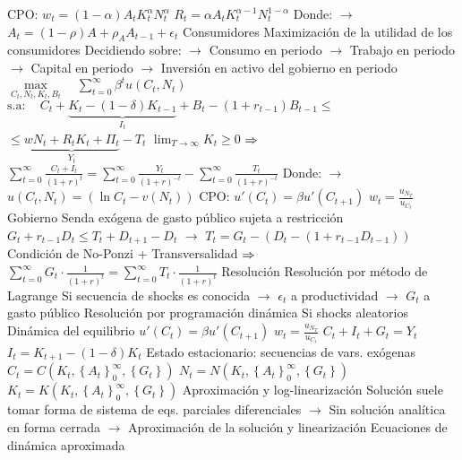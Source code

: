\documentclass{nuevotema}
\begin{document}
\begin{esquemal}
				\4[] CPO: \quad $w_t = (1-\alpha) A_t K_t^\alpha N_t^\alpha$
				\4[] \quad \quad $R_t = \alpha A_t K_t^{\alpha-1} N_t^{1-\alpha}$
				\4[] Donde:
				\4[] $\to$ $A_t = (1-\rho)A + \rho_A A_{t-1} + \epsilon_t$
			\3 Consumidores
				\4 Maximización de la utilidad de los consumidores
				\4[] Decidiendo sobre:
				\4[] $\to$ Consumo en periodo
				\4[] $\to$ Trabajo en periodo
				\4[] $\to$ Capital en periodo
				\4[] $\to$ Inversión en activo del gobierno en periodo
				\4[] $\underset{C_t, N_t,K_t, B_t}{\max} \quad \sum_{t=0}^\infty \beta^t u(C_t, N_t)$
				\4[] $\text{s.a}: \quad C_t+\underbrace{K_t - (1-\delta)K_{t-1}}_{I_t} + B_t - (1+r_{t-1})B_{t-1} \leq$
				\4[] \quad \quad \quad $\leq \underbrace{wN_t + R_t K_t + \Pi_t}_{Y_t} - T_t$
				\4[] \quad \quad \quad $\lim_{T \to \infty}  K_t \geq 0$
				\4[] \quad \quad \quad $\then$ $\sum_{t=0}^\infty \frac{C_t + I_t}{(1+r)^t} = \sum_{t=0}^\infty \frac{ Y_t}{(1+r)^{-t}} - \sum_{t=0}^\infty \frac{T_t}{(1+r)^{-t}}$
				\4[] Donde:
				\4[] $\to$ $u(C_t, N_t) = \left( \ln C_t  - v(N_t) \right)$
				\4[] CPO: \quad $u'(C_t) = \beta u'(C_{t+1})$
				\4[] \quad \quad $w_t = \frac{u_{N_T}}{u_{C_t}}$
			\3 Gobierno
				\4 Senda exógena de gasto público sujeta a restricción
				\4[] $G_t + r_{t-1} D_t \leq T_t + D_{t+1} - D_t$
				\4[] $\to$ $T_t = G_t - \left( D_t - (1+r_{t-1} D_{t-1}) \right)$
				\4[] Condición de No-Ponzi + Transversalidad
				\4[] $\then$ $\sum_{t=0}^\infty G_t \cdot \frac{1}{(1+r)^t} = \sum_{t=0}^\infty T_t \cdot \frac{1}{(1+r)^t}$
			\3 Resolución
				\4 Resolución por método de Lagrange
				\4[] Si secuencia de shocks es conocida
				\4[] $\to$ $\epsilon_t$ a productividad
				\4[] $\to$ $G_t$ a gasto público
				\4 Resolución por programación dinámica
				\4[] Si shocks aleatorios
			\3 Dinámica del equilibrio
				\4[] $u'(C_t) = \beta u'(C_{t+1})$
				\4[] $w_t = \frac{u_{N_T}}{u_{C_t}}$
				\4[] $C_t + I_t + G_t = Y_t$
				\4[] $I_t = K_{t+1} - (1-\delta) K_t$
				\4[$\then$] Estado estacionario: secuencias de vars. exógenas
				\4[] $C_t = C(K_t, \left\lbrace A_t \right\rbrace^\infty_0, \left\lbrace G_t \right\rbrace )$
				\4[] $N_t = N(K_t, \left\lbrace A_t \right\rbrace^\infty_0, \left\lbrace G_t \right\rbrace )$
				\4[] $K_t = K (K_t, \left\lbrace A_t \right\rbrace^\infty_0, \left\lbrace G_t \right\rbrace )$
				\4 Aproximación y log-linearización
				\4[] Solución suele tomar forma de
				\4[] sistema de eqs. parciales diferenciales
				\4[] $\to$ Sin solución analítica en forma cerrada
				\4[] $\to$ Aproximación de la solución y linearización
				\4 Ecuaciones de dinámica aproximada

\end{esquemal}
\end{document}
